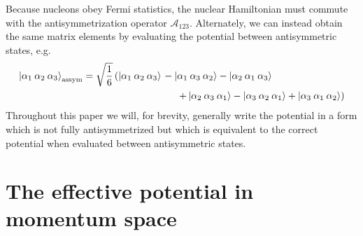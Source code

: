 \documentclass[%
 preprint,
 amsmath,amssymb,
 aps,
]{revtex4-1}
\begin{document}
Because nucleons obey Fermi statistics, the nuclear Hamiltonian must commute with the antisymmetrization operator $\mathcal{A}_{123}$. Alternately, we can instead obtain the same matrix elements by evaluating the potential between antisymmetric states, e.g.
\begin{equation}
\begin{split}
\ket{\alpha_1\:\alpha_2\:\alpha_3}_{\text{assym}} = \sqrt{\frac{1}{6}} \left( \ket{\alpha_1\:\alpha_2\:\alpha_3}\right. & - \ket{\alpha_1\:\alpha_3\:\alpha_2} - \ket{\alpha_2\:\alpha_1\:\alpha_3}   \\
&\hspace{.5cm}\left. +\ket{\alpha_2\:\alpha_3\:\alpha_1} - \ket{\alpha_3\:\alpha_2\:\alpha_1} + \ket{\alpha_3\:\alpha_1\:\alpha_2} \right)
\end{split}
\end{equation}
Throughout this paper we will, for brevity, generally write the potential in a form which is not fully antisymmetrized but which is equivalent to the correct potential when evaluated between antisymmetric states. 

\section{\label{sec:momentum} The effective potential in momentum space}
\end{document}
